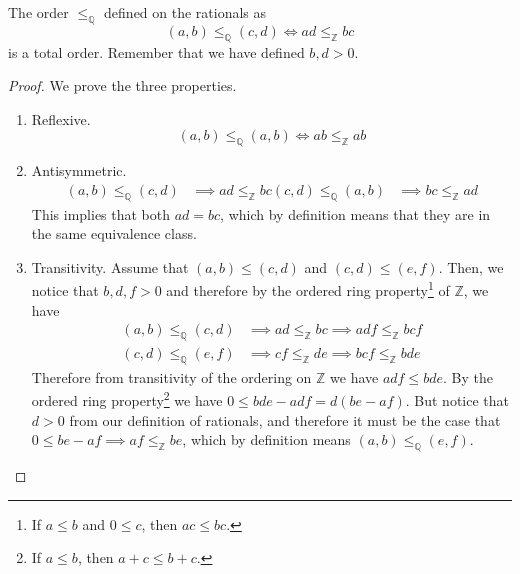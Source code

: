   \begin{theorem}
    The order $\leq_{\mathbb{Q}}$ defined on the rationals as 
    \begin{equation}
      (a, b) \leq_{\mathbb{Q}} (c, d) \iff ad \leq_{\mathbb{Z}} bc
    \end{equation}
    is a total order. Remember that we have defined $b, d > 0$. 
  \end{theorem}
  \begin{proof}
    We prove the three properties. 
    \begin{enumerate}
      \item Reflexive. 
      \begin{equation}
        (a, b) \leq_{\mathbb{Q}} (a, b) \iff ab \leq_{\mathbb{Z}} ab
      \end{equation} 

      \item Antisymmetric. 
      \begin{align}
        (a, b) \leq_{\mathbb{Q}} (c, d) & \implies ad \leq_{\mathbb{Z}} bc
        (c, d) \leq_{\mathbb{Q}} (a, b) & \implies bc \leq_{\mathbb{Z}} ad
      \end{align} 
      This implies that both $ad = bc$, which by definition means that they are in the same equivalence class. 

      \item Transitivity. Assume that $(a, b) \leq (c, d)$ and $(c, d) \leq (e, f)$. Then, we notice that $b, d, f > 0$ and therefore by the ordered ring property\footnote{If $a \leq b$ and $0 \leq c$, then $ac \leq bc$.} of $\mathbb{Z}$, we have 
      \begin{align}
        (a, b) \leq_{\mathbb{Q}} (c, d) & \implies ad \leq_{\mathbb{Z}} bc \implies adf \leq_{\mathbb{Z}} bcf \\ 
        (c, d) \leq_{\mathbb{Q}} (e, f) & \implies cf \leq_{\mathbb{Z}} de \implies bcf \leq_{\mathbb{Z}} bde
      \end{align}
      Therefore from transitivity of the ordering on $\mathbb{Z}$ we have $adf \leq bde$. By the ordered ring property\footnote{If $a \leq b$, then $a + c \leq b + c$.}  we have $0 \leq bde - adf = d(be - af)$. But notice that $d > 0$ from our definition of rationals, and therefore it must be the case that $0 \leq be - af \implies af \leq_{\mathbb{Z}} be$, which by definition means $(a, b) \leq_{\mathbb{Q}} (e, f)$. 
    \end{enumerate}
  \end{proof} 

